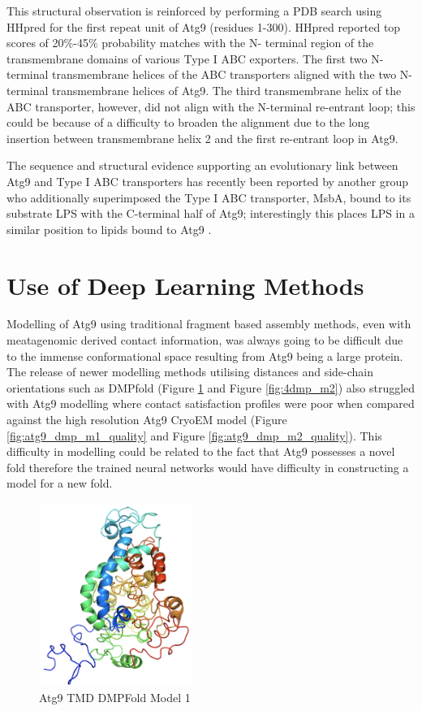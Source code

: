 This structural observation is reinforced by performing a PDB search using HHpred for the first repeat unit of Atg9 (residues 1-300). HHpred reported top scores of 20\%-45\% probability matches with the N- terminal region of the transmembrane domains of various Type I ABC exporters.  The first two N-terminal transmembrane helices of the ABC transporters aligned with the two N-terminal transmembrane helices of Atg9. The third transmembrane helix of the ABC transporter, however, did not align with the N-terminal re-entrant loop; this could be because of a difficulty to broaden the alignment due to the long insertion between transmembrane helix 2 and the first re-entrant loop in Atg9.

The sequence and structural evidence supporting an evolutionary link between Atg9 and Type I ABC transporters has recently been reported by another group \cite{maeda2020structure} who additionally superimposed the Type I ABC transporter, MsbA, bound to its substrate LPS with the C-terminal half of Atg9; interestingly this places LPS in a similar position to lipids bound to Atg9 \cite{maeda2019autophagic}. 

\section{Use of Deep Learning Methods}

Modelling of Atg9 using traditional fragment based assembly methods, even with meatagenomic derived contact information, was always going to be difficult due to the immense conformational space resulting from Atg9 being a large protein.  The release of newer modelling methods utilising distances and side-chain orientations such as DMPfold (Figure \ref{fig:4dmp_m1} and Figure \ref{fig:4dmp_m2}) also struggled with Atg9 modelling where contact satisfaction profiles were poor when compared against the high resolution Atg9 CryoEM model (Figure \ref{fig:atg9_dmp_m1_quality} and Figure \ref{fig:atg9_dmp_m2_quality}).  This difficulty in modelling could be related to the fact that Atg9 possesses a novel fold therefore the trained neural networks would have difficulty in constructing a model for a new fold.




\begin{figure}[th!]
    \centering
    \includegraphics[width=50mm, scale=0.5]{Modelling of Atg9/dmp_m1.png}
    \caption{Atg9 TMD DMPFold Model 1}
    \label{fig:4dmp_m1}
    \small
\end{figure}


